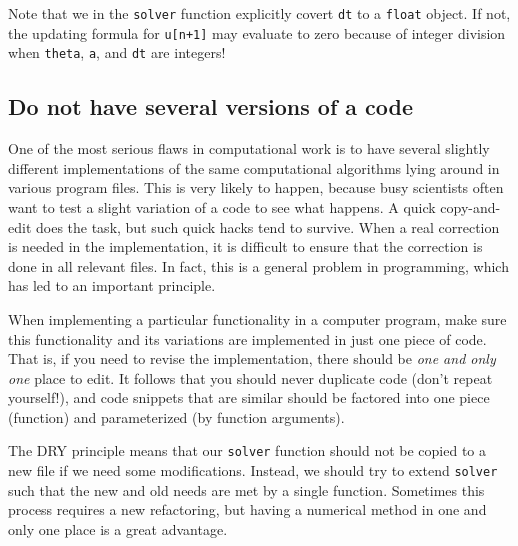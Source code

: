 \documentclass[graybox,sectrefs,envcountresetchap,open=right,final]{svmonodo}
\newenvironment{notice_mdfboxadmon}[1][]{
\begin{notice_mdfboxmdframed}[frametitle=#1]
}
{
\end{notice_mdfboxmdframed}
}
\begin{document}
\begin{notice_mdfboxadmon}
Note that we in the \texttt{solver} function explicitly covert \texttt{dt} to a
\texttt{float} object. If not, the updating formula for \texttt{u[n+1]} may evaluate
to zero because of integer division when \texttt{theta}, \texttt{a}, and \texttt{dt} are integers!
\end{notice_mdfboxadmon} %



\subsection{Do not have several versions of a code}

One of the most serious flaws in computational work is to have several
slightly different implementations of the same computational algorithms
lying around in various program files. This is very likely to happen,
because busy scientists often want to test a slight variation of a code to see
what happens. A quick copy-and-edit does the task, but such quick hacks tend
to survive. When a real correction is needed in the implementation,
it is difficult to ensure that the correction is done in all relevant files.
In fact, this is a general problem in programming, which has led to
an important principle.


\begin{notice_mdfboxadmon}
When implementing a particular functionality in a computer program, make sure
this functionality and its variations are implemented in just one piece
of code. That is, if you need to revise the implementation, there should be
\emph{one and only one} place to edit. It follows that you should never
duplicate code (don't repeat yourself!), and code snippets that are
similar should be factored into one piece (function) and parameterized (by
function arguments).
\end{notice_mdfboxadmon} %



The DRY principle means that our \texttt{solver} function should not be
copied to a new file if we need some modifications. Instead, we
should try to extend \texttt{solver} such that the new and old needs are
met by a single function. Sometimes this process requires a new
refactoring, but having a numerical method in one and only one place
is a great advantage.
\end{document}
